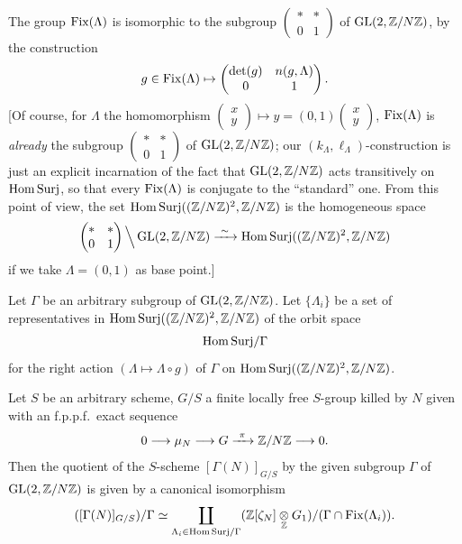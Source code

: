 \kmitem\label{item:10.3.4}
The group $\operatorname{Fix}(\Lambda)$ is isomorphic to the subgroup $\begin{pmatrix} * & * \\ 0 & 1 \end{pmatrix}$ of $\operatorname{GL}(2,\mathbb{Z}/N\mathbb{Z})$, by the construction
\[
g \in \operatorname{Fix}(\Lambda) \mapsto \begin{pmatrix} \det(g) & n(g,\Lambda) \\ 0 & 1 \end{pmatrix} .
\]
[Of course, for $\Lambda$ the homomorphism $\begin{pmatrix} x \\ y \end{pmatrix} \mapsto y = (0,1)\begin{pmatrix} x \\ y \end{pmatrix}$, $\operatorname{Fix}(\Lambda)$ is \emph{already} the subgroup $\begin{pmatrix} * & * \\ 0 & 1 \end{pmatrix}$ of $\operatorname{GL}(2,\mathbb{Z}/N\mathbb{Z})$; our $(k_\Lambda, \ell_\Lambda)$-construction is just an explicit incarnation of the fact that $\operatorname{GL}(2,\mathbb{Z}/N\mathbb{Z})$ acts transitively on $\mathrm{Hom\,Surj}$, so that every $\operatorname{Fix}(\Lambda)$ is conjugate to the ``standard'' one. From this point of view, the set $\mathrm{Hom\,Surj}((\mathbb{Z}/N\mathbb{Z})^2, \mathbb{Z}/N\mathbb{Z})$ is the homogeneous space
\begin{equation}\label{eq:10.3.4.1}
\begin{pmatrix} * & * \\ 0 & 1 \end{pmatrix} \Big\backslash \operatorname{GL}(2,\mathbb{Z}/N\mathbb{Z}) \xrightarrow{\ \sim\ } \mathrm{Hom\,Surj}((\mathbb{Z}/N\mathbb{Z})^2, \mathbb{Z}/N\mathbb{Z})
\end{equation}
if we take $\Lambda = (0,1)$ as base point.]

\begin{kcor}\label{cor:10.3.5}
Let $\Gamma$ be an arbitrary subgroup of $\operatorname{GL}(2,\allowbreak \mathbb{Z}/N\mathbb{Z})$. Let $\{\Lambda_i\}$ be a set of representatives in $\mathrm{Hom\,Surj}((\mathbb{Z}/N\mathbb{Z})^2,\allowbreak \mathbb{Z}/N\mathbb{Z})$ of the orbit space
\[
\mathrm{Hom\,Surj}/\Gamma
\]
for the right action $(\Lambda \mapsto \Lambda \circ g)$ of $\Gamma$ on $\mathrm{Hom\,Surj}((\mathbb{Z}/N\mathbb{Z})^2, \mathbb{Z}/N\mathbb{Z})$.

Let $S$ be an arbitrary scheme, $G/S$ a finite locally free $S$-group killed by $N$ given with an f.p.p.f.\ exact sequence
\[
0 \longrightarrow \mu_N \longrightarrow G \xrightarrow{\ \pi\ } \mathbb{Z}/N\mathbb{Z} \longrightarrow 0 .
\]
Then the quotient of the $S$-scheme $[\Gamma(N)]_{G/S}$ by the given subgroup $\Gamma$ of $\operatorname{GL}(2,\mathbb{Z}/N\mathbb{Z})$ is given by a canonical isomorphism
\[
([\Gamma(N)]_{G/S})/\Gamma \simeq \coprod_{\Lambda_i \in \mathrm{Hom\,Surj}/\Gamma} (\mathbb{Z}[\zeta_N] \underset{\mathbb{Z}}{\otimes} G_1)/(\Gamma \cap \operatorname{Fix}(\Lambda_i)) .
\]
\end{kcor}


